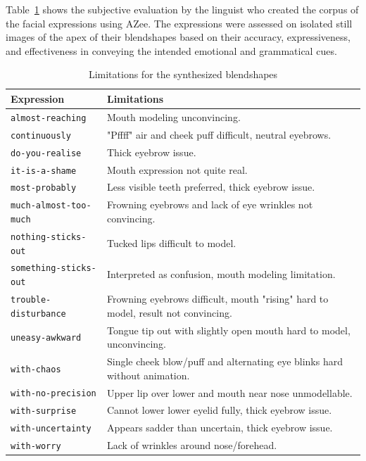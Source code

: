 \documentclass[../../main]{subfiles}
\begin{document}
Table~\ref{tab:facial_expressions_evaluation} shows the subjective evaluation by the linguist who created the corpus of the facial expressions using AZee. The expressions were assessed on isolated still images of the apex of their blendshapes based on their accuracy, expressiveness, and effectiveness in conveying the intended emotional and grammatical cues.

\begin{table}
    \centering
    \begin{tabular}{|l|p{8cm}|}
    \hline
    \textbf{Expression} & \textbf{Limitations} \\
    \hline
    \texttt{almost-reaching} & Mouth modeling unconvincing. \\
    \hline
    \texttt{continuously} & "Pffff" air and cheek puff difficult, neutral eyebrows. \\
    \hline
    \texttt{do-you-realise} & Thick eyebrow issue. \\
    \hline
    \texttt{it-is-a-shame} & Mouth expression not quite real. \\
    \hline
    \texttt{most-probably} & Less visible teeth preferred, thick eyebrow issue. \\
    \hline
    \texttt{much-almost-too-much} & Frowning eyebrows and lack of eye wrinkles not convincing. \\
    \hline
    \texttt{nothing-sticks-out} & Tucked lips difficult to model. \\
    \hline
   \texttt{something-sticks-out} & Interpreted as confusion, mouth modeling limitation. \\
    \hline
    \texttt{trouble-disturbance} & Frowning eyebrows difficult, mouth "rising" hard to model, result not convincing. \\
    \hline
    \texttt{uneasy-awkward} & Tongue tip out with slightly open mouth hard to model, unconvincing. \\
    \hline
    \texttt{with-chaos} & Single cheek blow/puff and alternating eye blinks hard without animation. \\
    \hline
    \texttt{with-no-precision} & Upper lip over lower and mouth near nose unmodellable. \\
    \hline
    \texttt{with-surprise} & Cannot lower lower eyelid fully, thick eyebrow issue. \\
    \hline
    \texttt{with-uncertainty} & Appears sadder than uncertain, thick eyebrow issue. \\
    \hline
    \texttt{with-worry} & Lack of wrinkles around nose/forehead. \\
    \hline
    \end{tabular}
    \caption{Limitations for the synthesized blendshapes}
    \label{tab:facial_expressions_evaluation}
\end{table}
\end{document}
